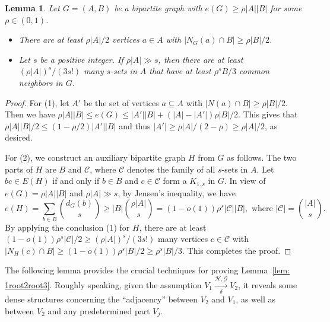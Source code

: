 \documentclass[11pt]{article}
\newtheorem{lem}[dfn]{Lemma}
\begin{document}
\begin{lem}\label{lem: bipartite average}
Let $G=(A,B)$ be a bipartite graph with $e(G)\geq \rho|A||B|$ for some $\rho\in (0,1)$.
\begin{itemize}
  \item[(1).] There are at least $\rho |A|/2$ vertices $a\in A$ with $|N_G(a)\cap B |\ge \rho |B |/2$.
  \item[(2).] Let $s$ be a positive integer. If $\rho |A|\gg s$, then there are at least $(\rho |A|)^s/(3s!)$  many $s$-sets in $A$ that have at least $\rho^s B/3$ common neighbors in $G$.
\end{itemize}
\end{lem}
\begin{proof}
For (1), let $A'$ be the set of vertices $a\subseteq A$ with $|N(a)\cap B |\ge \rho |B|/2$.
Then we have $\rho|A||B|\leq e(G)\leq |A'||B| + (|A|-|A'|)\rho |B|/2$.
This gives that $\rho|A||B |/2\le (1-\rho/2)|A'||B|$ and thus $|A'|\ge \rho |A|/(2-\rho)\ge \rho |A|/2$, as desired.

For (2), we construct an auxiliary bipartite graph $H$ from $G$ as follows.
The two parts of $H$ are $B$ and $\mathcal C$, where $\mathcal C$ denotes the family of all $s$-sets in $A$.
Let $bc\in E(H)$ if and only if $b\in B$ and $c\in \mathcal C$ form a $K_{1,s}$ in $G$.
In view of $e(G)= \rho|A||B|$ and $\rho |A|\gg s$, by Jensen's inequality, we have
$$e(H)  =\sum_{b\in B}\binom{d_G(b)}{s}\ge |B|\binom{ \rho|A|}{s} =  (1-o(1)) \rho^s|\mathcal C||B|, \mbox{ where } |\mathcal C|=\binom{|A|}{s}.$$
By applying the conclusion (1) for $H$, there are at least $(1-o(1)) \rho^s|\mathcal C|/2\geq (\rho |A|)^s/(3s!)$  many  vertices $c\in \mathcal C$ with $|N_H(c)\cap B |\ge (1-o(1))\rho^s  |B |/2 \ge \rho^s |B |/3$. This completes the proof.
\end{proof}

The following lemma provides the crucial techniques for proving Lemma~\ref{lem: 1root2root3}.
Roughly speaking, given the assumption $V_1 \xrightarrow[\delta]{\mathcal H, \mathcal G} V_2$,
it reveals some dense structures concerning the ``adjacency'' between $V_2$ and $V_1$, as well as between $V_2$ and any predetermined part $V_j$.
\end{document}
